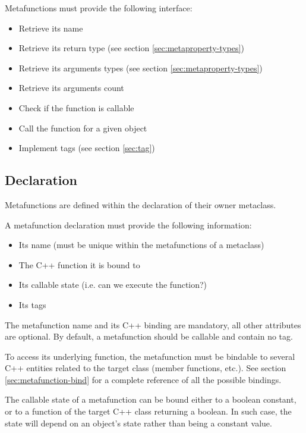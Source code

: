 \documentclass[a4paper, twoside]{report}
\begin{document}
	Metafunctions must provide the following interface:

	\begin{itemize}
		\item Retrieve its name
		\item Retrieve its return type (see section \ref{sec:metaproperty-types})
		\item Retrieve its arguments types (see section \ref{sec:metaproperty-types})
		\item Retrieve its arguments count
		\item Check if the function is callable
		\item Call the function for a given object
		\item Implement tags (see section \ref{sec:tag})
	\end{itemize}

\subsection{Declaration}

	Metafunctions are defined within the declaration of their owner metaclass.
	
	A metafunction declaration must provide the following information:
	
	\begin{itemize}
		\item Its name (must be unique within the metafunctions of a metaclass)
		\item The C++ function it is bound to
		\item Its callable state (i.e. can we execute the function?)
		\item Its tags
	\end{itemize}
	
	The metafunction name and its C++ binding are mandatory, all other attributes are optional. By default,
	a metafunction should be callable and contain no tag.
	
	To access its underlying function, the metafunction must be bindable to several C++ entities related to the target class
	(member functions, etc.). See section \ref{sec:metafunction-bind} for a complete reference
	of all the possible bindings.

	The callable state of a metafunction can be bound either to a boolean constant,
	or to a function of the target C++ class returning a boolean. In such case, the state will depend
	on an object's state rather than being a constant value.
\end{document}
